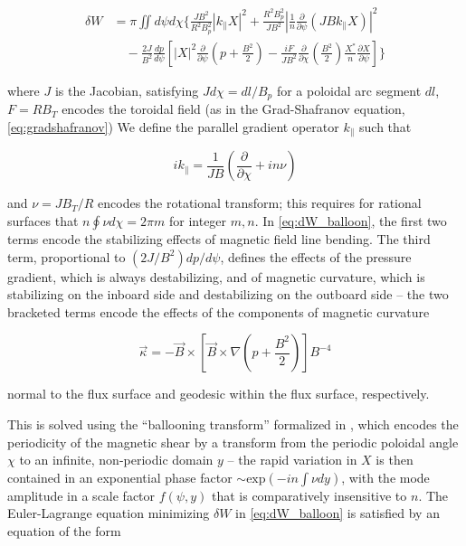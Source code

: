 \begin{equation}\label{eq:dW_balloon}
 \begin{aligned}
  \delta W &= \pi \iint d\psi d\chi \Bigg\{ \frac{JB^2}{R^2 B_p^2} \left| k_\parallel X \right|^2 + \frac{R^2 B_p^2}{JB^2} \left| \frac{1}{n} \frac{\partial}{\partial \psi} \left( JB k_\parallel X \right) \right|^2\\
  &\quad- \frac{2J}{B^2} \frac{dp}{d\psi} \left[ \left| X \right|^2 \frac{\partial}{\partial \psi} \left( p + \frac{B^2}{2} \right) - \frac{iF}{JB^2} \frac{\partial}{\partial \chi} \left( \frac{B^2}{2} \right) \frac{X^*}{n} \frac{\partial X}{\partial \psi} \right] \Bigg\}
 \end{aligned}
\end{equation}

\noindent where $J$ is the Jacobian, satisfying $J d\chi = dl/B_p$ for a poloidal arc segment $dl$, $F = RB_T$ encodes the toroidal field (as in the Grad-Shafranov equation, \cref{eq:gradshafranov}) We define the parallel gradient operator $k_\parallel$ such that

\begin{equation}\label{eq:dW_kparallel}
  ik_\parallel = \frac{1}{JB} \left( \frac{\partial}{\partial \chi} + in \nu \right)
\end{equation}

\noindent and $\nu = JB_T/R$ encodes the rotational transform; this requires for rational surfaces that $n \oint \nu d\chi = 2\pi m$ for integer $m,n$.  In \cref{eq:dW_balloon}, the first two terms encode the stabilizing effects of magnetic field line bending.  The third term, proportional to $\left(2J/B^2\right) dp/d\psi$, defines the effects of the pressure gradient, which is always destabilizing, and of magnetic curvature, which is stabilizing on the inboard side and destabilizing on the outboard side -- the two bracketed terms encode the effects of the components of magnetic curvature

\begin{equation}\label{eq:kappa}
 \vec{\kappa} = -\vec{B} \times \left[ \vec{B} \times \nabla \left( p + \frac{B^2}{2} \right) \right] B^{-4}
\end{equation}

\noindent normal to the flux surface and geodesic within the flux surface, respectively.

This is solved using the ``ballooning transform'' formalized in \cite{Connor1978}, which encodes the periodicity of the magnetic shear by a transform from the periodic poloidal angle $\chi$ to an infinite, non-periodic domain $y$ -- the rapid variation in $X$ is then contained in an exponential phase factor $\sim \mbox{exp}(-in\int \nu dy)$, with the mode amplitude in a scale factor $f(\psi,y)$ that is comparatively insensitive to $n$.  The Euler-Lagrange equation minimizing $\delta W$ in \cref{eq:dW_balloon} is satisfied by an equation of the form

